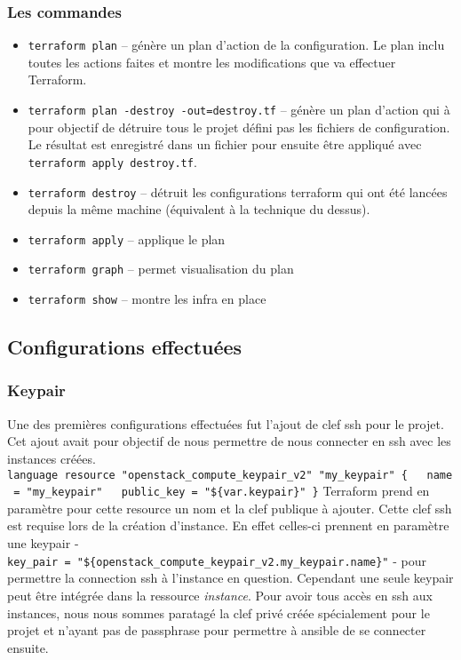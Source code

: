 \documentclass[]{article}
\providecommand{\tightlist}{%
  \setlength{\itemsep}{0pt}\setlength{\parskip}{0pt}}
\begin{document}
\subsubsection{Les commandes}\label{les-commandes}

\begin{itemize}
\tightlist
\item
  \texttt{terraform\ plan} -- génère un plan d'action de la
  configuration. Le plan inclu toutes les actions faites et montre les
  modifications que va effectuer Terraform.
\item
  \texttt{terraform\ plan\ -destroy\ -out=destroy.tf} -- génère un plan
  d'action qui à pour objectif de détruire tous le projet défini pas les
  fichiers de configuration. Le résultat est enregistré dans un fichier
  pour ensuite être appliqué avec \texttt{terraform\ apply\ destroy.tf}.
\item
  \texttt{terraform\ destroy} -- détruit les configurations terraform
  qui ont été lancées depuis la même machine (équivalent à la technique
  du dessus).
\item
  \texttt{terraform\ apply} -- applique le plan
\item
  \texttt{terraform\ graph} -- permet visualisation du plan
\item
  \texttt{terraform\ show} -- montre les infra en place
\end{itemize}

\subsection{Configurations
effectuées}\label{configurations-effectuuxe9es}

\subsubsection{Keypair}\label{keypair}

Une des premières configurations effectuées fut l'ajout de clef ssh pour
le projet. Cet ajout avait pour objectif de nous permettre de nous
connecter en ssh avec les instances créées.
\texttt{language\ resource\ "openstack\_compute\_keypair\_v2"\ "my\_keypair"\ \{\ \ \ name\ =\ "my\_keypair"\ \ \ public\_key\ =\ "\$\{var.keypair\}"\ \}}
Terraform prend en paramètre pour cette resource un nom et la clef
publique à ajouter. Cette clef ssh est requise lors de la création
d'instance. En effet celles-ci prennent en paramètre une keypair -
\texttt{key\_pair\ =\ "\$\{openstack\_compute\_keypair\_v2.my\_keypair.name\}"}
- pour permettre la connection ssh à l'instance en question. Cependant
une seule keypair peut être intégrée dans la ressource \emph{instance}.
Pour avoir tous accès en ssh aux instances, nous nous sommes paratagé la
clef privé créée spécialement pour le projet et n'ayant pas de
passphrase pour permettre à ansible de se connecter ensuite.
\end{document}
